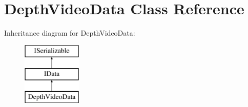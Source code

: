 \hypertarget{class_depth_video_data}{}\section{Depth\+Video\+Data Class Reference}
\label{class_depth_video_data}
Inheritance diagram for Depth\+Video\+Data\+:\begin{figure}[H]
\begin{center}
\leavevmode
\includegraphics[height=3.000000cm]{class_depth_video_data}
\end{center}
\end{figure}
